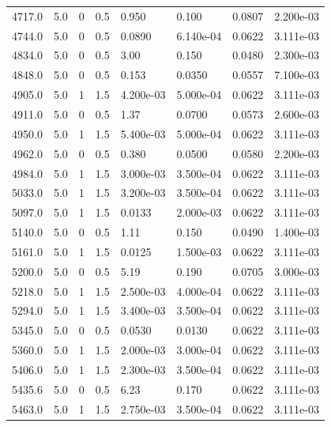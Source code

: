 \documentclass[preview]{standalone}
\begin{document}
{{{{\begin{tabular}{L{1.2cm}C{1.2cm} C{0.3cm}C{0.5cm} C{1.4cm}C{1.4cm} C{1.4cm}C{1.4cm}}
  4717.0  &   5.0  & 0     & 0.5 &  0.950  & 0.100  & 0.0807 &  2.200e-03   \\ 
  4744.0  &   5.0  & 0     & 0.5 &  0.0890  & 6.140e-04  & 0.0622 &  3.111e-03   \\ 
  4834.0  &   5.0  & 0     & 0.5 &  3.00  & 0.150  & 0.0480 &  2.300e-03   \\ 
  4848.0  &   5.0  & 0     & 0.5 &  0.153  & 0.0350  & 0.0557 &  7.100e-03   \\ 
  4905.0  &   5.0  & 1     & 1.5 &  4.200e-03  & 5.000e-04  & 0.0622 &  3.111e-03   \\ 
  4911.0  &   5.0  & 0     & 0.5 &  1.37  & 0.0700  & 0.0573 &  2.600e-03   \\ 
  4950.0  &   5.0  & 1     & 1.5 &  5.400e-03  & 5.000e-04  & 0.0622 &  3.111e-03   \\ 
  4962.0  &   5.0  & 0     & 0.5 &  0.380  & 0.0500  & 0.0580 &  2.200e-03   \\ 
  4984.0  &   5.0  & 1     & 1.5 &  3.000e-03  & 3.500e-04  & 0.0622 &  3.111e-03   \\ 
  5033.0  &   5.0  & 1     & 1.5 &  3.200e-03  & 3.500e-04  & 0.0622 &  3.111e-03   \\ 
  5097.0  &   5.0  & 1     & 1.5 &  0.0133  & 2.000e-03  & 0.0622 &  3.111e-03   \\ 
  5140.0  &   5.0  & 0     & 0.5 &  1.11  & 0.150  & 0.0490 &  1.400e-03   \\ 
  5161.0  &   5.0  & 1     & 1.5 &  0.0125  & 1.500e-03  & 0.0622 &  3.111e-03   \\ 
  5200.0  &   5.0  & 0     & 0.5 &  5.19  & 0.190  & 0.0705 &  3.000e-03   \\ 
  5218.0  &   5.0  & 1     & 1.5 &  2.500e-03  & 4.000e-04  & 0.0622 &  3.111e-03   \\ 
  5294.0  &   5.0  & 1     & 1.5 &  3.400e-03  & 3.500e-04  & 0.0622 &  3.111e-03   \\ 
  5345.0  &   5.0  & 0     & 0.5 &  0.0530  & 0.0130  & 0.0622 &  3.111e-03   \\ 
  5360.0  &   5.0  & 1     & 1.5 &  2.000e-03  & 3.000e-04  & 0.0622 &  3.111e-03   \\ 
  5406.0  &   5.0  & 1     & 1.5 &  2.300e-03  & 3.500e-04  & 0.0622 &  3.111e-03   \\ 
  5435.6  &   5.0  & 0     & 0.5 &  6.23  & 0.170  & 0.0622 &  3.111e-03   \\ 
  5463.0  &   5.0  & 1     & 1.5 &  2.750e-03  & 3.500e-04  & 0.0622 &  3.111e-03   \\ 

\end{tabular}}}}}
\end{document}

